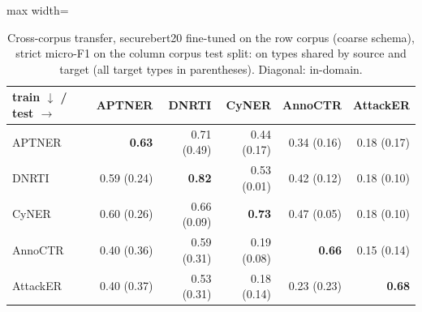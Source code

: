 \begin{table}[t]
\centering
\caption{Cross-corpus transfer, securebert20 fine-tuned on the row corpus (coarse schema), strict micro-F1 on the column corpus test split: on types shared by source and target (all target types in parentheses). Diagonal: in-domain.}
\label{tab:transfer_securebert20}
\small
\begin{adjustbox}{max width=\textwidth}
\begin{tabular}{lrrrrr}
\toprule
train $\downarrow$ / test $\rightarrow$ & APTNER & DNRTI & CyNER & AnnoCTR & AttackER \\
\midrule
APTNER & \textbf{0.63} & 0.71 (0.49) & 0.44 (0.17) & 0.34 (0.16) & 0.18 (0.17) \\
DNRTI & 0.59 (0.24) & \textbf{0.82} & 0.53 (0.01) & 0.42 (0.12) & 0.18 (0.10) \\
CyNER & 0.60 (0.26) & 0.66 (0.09) & \textbf{0.73} & 0.47 (0.05) & 0.18 (0.10) \\
AnnoCTR & 0.40 (0.36) & 0.59 (0.31) & 0.19 (0.08) & \textbf{0.66} & 0.15 (0.14) \\
AttackER & 0.40 (0.37) & 0.53 (0.31) & 0.18 (0.14) & 0.23 (0.23) & \textbf{0.68} \\
\bottomrule
\end{tabular}
\end{adjustbox}
\end{table}